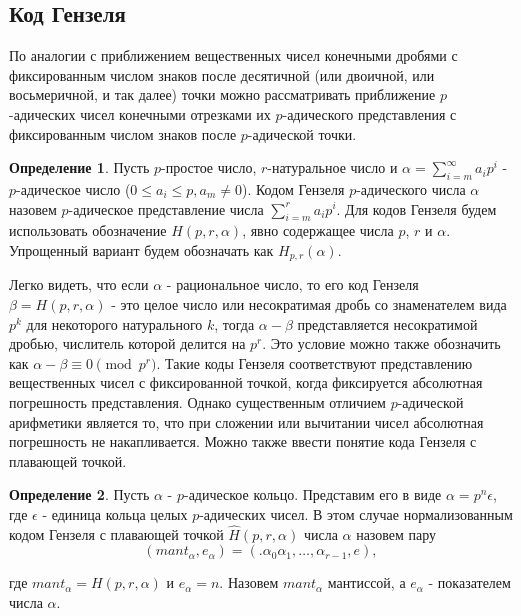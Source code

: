 \documentclass[master, och, diploma, times]{sty/SCWorks}
\theoremstyle{plain}
\theoremstyle{definition}
\newtheorem{defn}{Определение}[section]
\numberwithin{equation}{section}
\begin{document}
\subsection{Код Гензеля}
По аналогии с приближением вещественных чисел конечными дробями с фиксированным числом знаков после десятичной (или двоичной, или восьмеричной, и так далее) точки можно рассматривать приближение $p$-адических чисел конечными отрезками их $p$-адического представления с фиксированным числом знаков после $p$-адической точки.

\begin{defn}
Пусть $p$-простое число, $r$-натуральное число и $\alpha=\sum\limits^{\infty}_{i=m} a_ip^i$ - $p$-адическое число ($0 \le a_i \le p, a_m \neq 0$). Кодом Гензеля $p$-адического числа $\alpha$ назовем $p$-адическое представление числа $\sum\limits_{i=m}^{r}a_ip^i$. Для кодов Гензеля будем использовать обозначение $H(p,r,\alpha)$, явно содержащее числа $p$, $r$ и $\alpha$. Упрощенный вариант будем обозначать как $H_{p,r}(\alpha)$\cite{bib:analysis:gouvea}.
\end{defn}

Легко видеть, что если $\alpha$ - рациональное число, то его код Гензеля $\beta=H(p,r, \alpha)$ - это целое число или несократимая дробь со знаменателем вида $p^k$ для некоторого натурального $k$, тогда $\alpha-\beta$ представляется несократимой дробью, числитель которой делится на $p^r$. Это условие можно также обозначить как $\alpha - \beta \equiv 0 \pmod {p^r}$.  Такие коды Гензеля соответствуют представлению вещественных чисел с фиксированной точкой, когда фиксируется абсолютная погрешность представления. Однако существенным отличием $p$-адической арифметики является то, что при сложении или вычитании чисел абсолютная погрешность не накапливается. Можно также ввести понятие кода Гензеля с плавающей точкой.

\begin{defn}
Пусть $\alpha$ - $p$-адическое кольцо. Представим его в виде $\alpha=p^n\epsilon$, где $\epsilon$ - единица кольца целых $p$-адических чисел. В этом случае нормализованным кодом Гензеля с плавающей точкой $\hat H (p, r, \alpha)$ числа $\alpha$ назовем пару
\begin{equation}
	(mant_{\alpha},e_{\alpha})=(.\alpha_0\alpha_1,\dots,\alpha_{r-1},e),
\end{equation}

\noindent где \mbox{$mant_\alpha = H(p,r,\alpha)$} и $e_\alpha=n$. Назовем $mant_\alpha$ мантиссой, а $e_\alpha$ - показателем числа $\alpha$\cite{bib:analisys:khrennikov:2}.
\end{defn}
\end{document}
